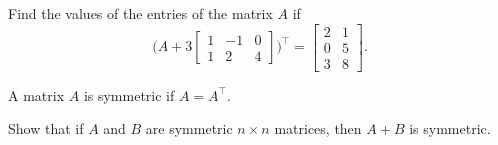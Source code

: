 \documentclass[20pt,a4paper]{extarticle}
\newcounter{example}[section]
\newcounter{definition}[section]
\begin{document}
\vspace*{-24pt}

\begin{example}
Find the values of the entries of the matrix $A$ if
	\[
		\Big( A + 3 \begin{bmatrix} 1 & -1 & 0 \\ 1 & 2 & 4 \end{bmatrix} \Big)^{\top} = \begin{bmatrix} 2 & 1 \\ 0 & 5 \\ 3 & 8 \end{bmatrix} .
	\]
\end{example}

\newpage 

\phantom{2}

\vspace*{8cm}

\begin{definition}
A matrix $A$ is symmetric if $A = A^\top$. 
\end{definition}

\begin{example}
Show that if $A$ and $B$ are symmetric $n \times n$ matrices, then $A + B$ is symmetric.
\end{example}

\begin{solution}

\end{solution}
\end{document}
